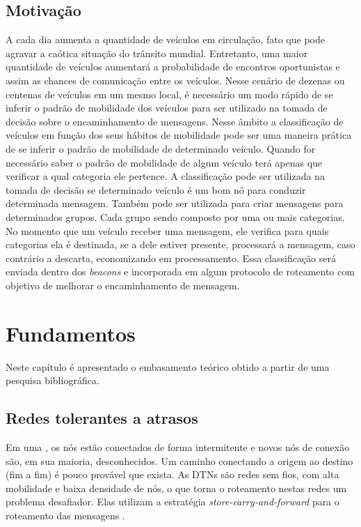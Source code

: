\documentclass[mestrado, pre-defesa, english, brazil]{packages/icmc}
\begin{document}
\section{Motivação} \label{motivacao}

A cada dia aumenta a quantidade de veículos em circulação, fato que pode agravar a caótica situação do trânsito mundial. Entretanto, uma maior quantidade de veículos aumentará a probabilidade de encontros oportunistas e assim as chances de comunicação entre os veículos. Nesse cenário de dezenas ou centenas de veículos em um mesmo local, é necessário um modo rápido de se inferir o padrão de mobilidade dos veículos para ser utilizado na tomada de decisão sobre o encaminhamento de mensagens. Nesse âmbito a classificação de veículos em função dos seus hábitos de mobilidade pode ser uma maneira prática de se inferir o padrão de mobilidade de determinado veículo. Quando for necessário saber o padrão de mobilidade de algum veículo terá apenas que verificar a qual categoria ele pertence. A classificação pode ser utilizada na tomada de decisão se determinado veículo é um bom nó para conduzir determinada mensagem. Também pode ser utilizada para criar mensagens para determinados grupos. Cada grupo sendo composto por uma ou mais categorias. No momento que um veículo receber uma mensagem, ele verifica para quais categorias ela é destinada, se a dele estiver presente, processará a mensagem, caso contrário a descarta, economizando em processamento. Essa classificação será enviada dentro dos \textit{beacons} e incorporada em algum protocolo de roteamento com objetivo de melhorar o encaminhamento de mensagem.

\chapter{Fundamentos} \label{fundamentos}

Neste capítulo é apresentado o embasamento teórico obtido a partir de uma pesquisa bibliográfica.

\section{Redes tolerantes a atrasos} \label{dtn}

Em uma , os nós estão conectados de forma intermitente e novos nós de conexão são, em sua maioria, desconhecidos. Um caminho conectando a origem ao destino (fim a fim) é pouco provável que exista. As DTNs são redes sem fios, com alta mobilidade e baixa densidade de nós, o que torna o roteamento nestas redes um problema desafiador. Elas utilizam a estratégia \textit{store-carry-and-forward} para o roteamento das mensagens \cite{Jain-2004, Bulut-2010}.
\end{document}
